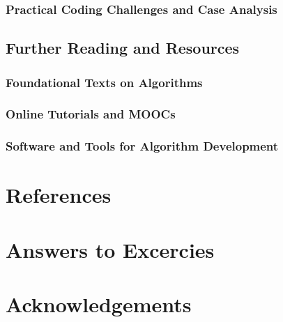 \documentclass[12pt]{book} %
\begin{document}
\subsection{Practical Coding Challenges and Case Analysis}

\section{Further Reading and Resources}
\subsection{Foundational Texts on Algorithms}
\subsection{Online Tutorials and MOOCs}
\subsection{Software and Tools for Algorithm Development}



\backmatter
\chapter{References}

\chapter{Answers to Excercies}

\chapter{Acknowledgements}
\end{document}
